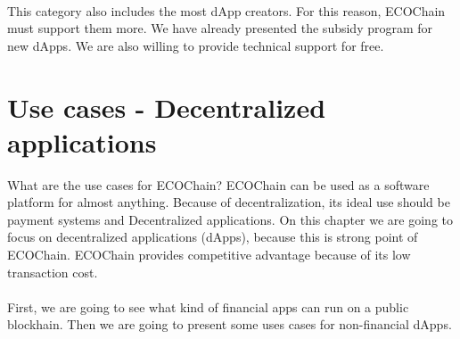 \documentclass{article}
\begin{document}
\paragraph{}
This category also includes the most dApp creators. For this reason, ECOChain must support them more. We have already presented the subsidy program for new dApps. We are also willing to provide technical support for free.
 
\section{Use cases - Decentralized applications}
What are the use cases for ECOChain? ECOChain can be used as a software platform for almost anything. Because of decentralization, its ideal use should be payment systems and Decentralized applications. On this chapter we are going to focus on decentralized applications (dApps), because this is strong point of ECOChain. ECOChain provides competitive advantage because of its low transaction cost.
\paragraph{}
First, we are going to see what kind of financial apps can run on a public blockhain. Then we are going to present some uses cases for non-financial dApps.
\end{document}

